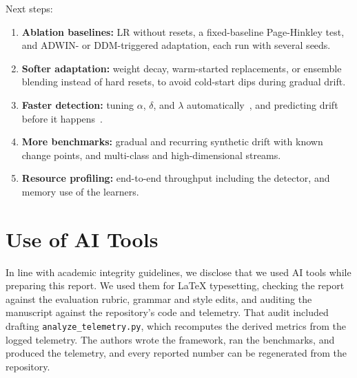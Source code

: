 \documentclass[conference]{IEEEtran}
\begin{document}
Next steps:
\begin{enumerate}
    \item \textbf{Ablation baselines:} LR without resets, a fixed-baseline Page-Hinkley test, and ADWIN- or DDM-triggered adaptation, each run with several seeds.
    \item \textbf{Softer adaptation:} weight decay, warm-started replacements, or ensemble blending instead of hard resets, to avoid cold-start dips during gradual drift.
    \item \textbf{Faster detection:} tuning $\alpha$, $\delta$, and $\lambda$ automatically~\cite{rum2026}, and predicting drift before it happens~\cite{cano2026, zhao2025}.
    \item \textbf{More benchmarks:} gradual and recurring synthetic drift with known change points, and multi-class and high-dimensional streams.
    \item \textbf{Resource profiling:} end-to-end throughput including the detector, and memory use of the learners.
\end{enumerate}

\section*{Use of AI Tools}
In line with academic integrity guidelines, we disclose that we used AI tools while preparing this report.
We used them for \LaTeX{} typesetting, checking the report against the evaluation rubric, grammar and style edits, and auditing the manuscript against the repository's code and telemetry.
That audit included drafting \texttt{analyze\_telemetry.py}, which recomputes the derived metrics from the logged telemetry.
The authors wrote the framework, ran the benchmarks, and produced the telemetry, and every reported number can be regenerated from the repository.
\end{document}
